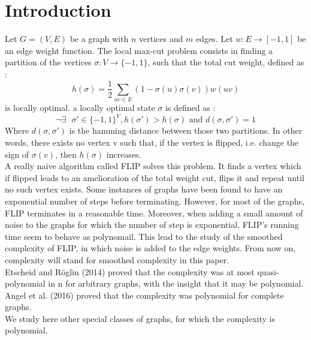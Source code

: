 \section{Introduction}

Let $G = (V,E)$ be a graph with $n$ vertices and $m$ edges.  Let $w : E \rightarrow [-1, 1]$ be an edge weight function. The local max-cut problem consists in finding a partition of the vertices $\sigma : V \rightarrow \{-1,1\}$, such that the total cut weight, defined as :
\begin{equation*}
h(\sigma) = \dfrac{1}{2}\sum_{uv \in E}(1 - \sigma(u)\sigma(v))w(uv)
\end{equation*}
is locally optimal. a locally optimal state $\sigma$ is defined as :
\begin{equation*}
\neg \exists \text{  }\sigma' \in \{-1, 1\}^V,  h(\sigma') > h(\sigma) \text{ and } d(\sigma, \sigma') = 1
\end{equation*}
Where $d(\sigma, \sigma')$ is the hamming distance between those two partitions. In other words, there exists no vertex v such that, if the vertex is flipped, i.e. change the sign of $\sigma(v)$, then $h(\sigma)$ increases.\\ 

A really naive algorithm called FLIP solves this problem. It finds a vertex which if flipped leads to an amelioration of the total weight cut, flips it and repeat until no such vertex exists. Some instances of graphs have been found to have an exponential number of steps before terminating. However, for most of the graphs, FLIP terminates in a reasonable time. Moreover, when adding a small amount of noise to the graphs for which the number of step is exponential, FLIP's running time seem to behave as polynomail. This lead to the study of the smoothed complexity of FLIP, in which noise is added to the edge weights. From now on, complexity will stand for smoothed complexity in this paper. \\

Etscheid and Röglin (2014) \cite{Roglin2014} proved that the complexity was at most quasi-polynomial in n for arbitrary graphs, with the insight that it may be polynomial. Angel et al. (2016) \cite{angel2016local} proved that the complexity was polynomial for complete graphs. \\
We study here other special classes of graphs, for which the complexity is polynomial.
